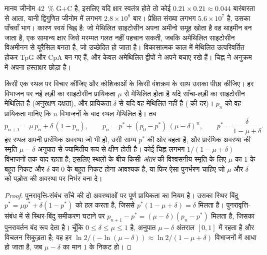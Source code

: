 \begin{example}[जीनोम में CpG की कमी क्यों है]\label{ex:b3:chromatin-epigenetics:cpg-deficit}
मानव जीनोम \qty{42}{\%} G$+$C है, इसलिए यदि क्षार स्वतंत्र होते तो कोई
 $0.21\times 0.21 \approx 0.044$ बारंबारता से आता, यानी द्विगुणित
जीनोम में लगभग $2.8\times 10^{8}$ बार। प्रेक्षित संख्या लगभग
$5.6\times 10^{7}$ है, उसका पाँचवाँ भाग। कारण स्वयं चिह्न है: जो
मेथिलित साइटोसीन अपना अमीनो समूह खोता है वह थाइमीन बन जाता है, एक
सामान्य क्षार जिसे मरम्मत गलत नहीं पहचान सकती, जबकि अमेथिलित साइटोसीन
विअमीनन से यूरैसिल बनता है, जो उच्छेदित हो जाता है। विकासात्मक काल में
मेथिलित  उत्परिवर्तित होकर TpG और CpA बन गए हैं, और केवल अमेथिलित
द्वीपों ने अपने  बचाए रखे हैं। चिह्न ने अनुक्रम में अपना हस्ताक्षर
छोड़ा है।
\end{example}

\begin{theorem}\label{thm:b3:chromatin-epigenetics:maintenance}
किसी एक  स्थल पर विचार कीजिए और कोशिकाओं के किसी वंशक्रम के साथ उसका
पीछा कीजिए। हर विभाजन पर नई लड़ी का साइटोसीन प्रायिकता $\mu$ से
मेथिलित होता है यदि साँचा-लड़ी का साइटोसीन मेथिलित है (अनुरक्षण दक्षता),
और प्रायिकता $\delta$ से यदि वह मेथिलित नहीं है ( की दर)।
$p_{n}$ को वह प्रायिकता मानिए कि $n$ विभाजनों के बाद स्थल मेथिलित है।
तब
\[
p_{n+1} = \mu\, p_{n} + \delta\,(1 - p_{n}),
\qquad
p_{n} = p^{*} + (p_{0} - p^{*})\,(\mu - \delta)^{n},
\qquad
p^{*} = \frac{\delta}{1 - \mu + \delta}.
\]
हर स्थल अपनी प्रारंभिक अवस्था जो भी हो, उसी साम्य $p^{*}$ की ओर बहता
है, और प्रारंभिक अवस्था की स्मृति $\mu - \delta$ अनुपात से ज्यामितीय
रूप से क्षीण होती है। कोई चिह्न लगभग $1/(1 - \mu + \delta)$ विभाजनों
तक याद रहता है; इसलिए स्थलों के बीच किसी \emph{अंतर} की विश्वसनीय
स्मृति के लिए $\mu$ का $1$ के बहुत निकट और $\delta$ का $0$ के बहुत
निकट होना आवश्यक है, या फिर ऐसा पुनर्भरण चाहिए जो $\mu$ और $\delta$ को
पड़ोस की अवस्था पर निर्भर बना दे।
\end{theorem}
\begin{proof}
पुनरावृत्ति-संबंध साँचे की दो अवस्थाओं पर पूर्ण प्रायिकता का नियम है।
उसका स्थिर बिंदु $p^{*} = \mu p^{*} + \delta(1 -
p^{*})$ को हल करता है, जिससे $p^{*}(1 - \mu + \delta) = \delta$ मिलता
है। पुनरावृत्ति-संबंध
में से स्थिर-बिंदु समीकरण घटाने पर $p_{n+1} - p^{*} = (\mu -
\delta)(p_{n} - p^{*})$ मिलता है, जिसका पुनरावर्तन बंद रूप देता है।
चूँकि $0 \le \delta \le \mu \le 1$ है, अनुपात $\mu - \delta$ अंतराल
$[0,1]$ में रहता है और विचलन सिकुड़ता है; वह हर $\ln 2 / (-\ln(\mu -
\delta)) \approx \ln 2/(1 - \mu + \delta)$ विभाजनों में आधा हो जाता है,
जब $\mu -
\delta$ का मान $1$ के निकट हो।
\end{proof}

